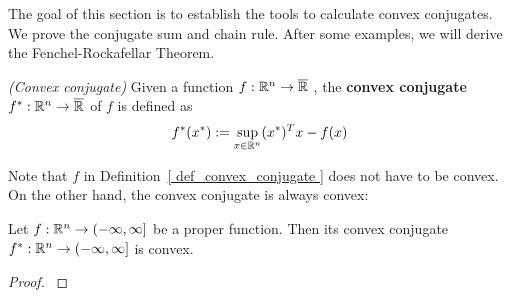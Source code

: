 The goal of this section is to establish the tools to calculate convex conjugates. 
We prove the conjugate sum and chain rule.
After some examples, we will derive the Fenchel-Rockafellar Theorem.
\begin{definition}
  \label{ def_convex_conjugate }
  \emph{(Convex conjugate)}
  Given a function
  $
    f:
    \mathbb{R}^n \to \overline{\mathbb{R}}
  $
  ,
  the 
  \textbf{convex conjugate}
  $
    f^*:
    \mathbb{R}^n \to \overline{\mathbb{R}}
  $
  of $f$ is defined as
  \begin{gather}
    f^*(x^*)
    :=
    \sup_{ x \in \mathbb{R}^n }
    (x^*)^T x - f(x)
  \end{gather}
\end{definition}

Note that $f$ in Definition~\ref{ def_convex_conjugate }
does not have to be convex. On the other hand, the convex conjugate is always convex:

\begin{proposition}
  Let  
  $
    f:
    \mathbb{R}^n \to ( - \infty, \infty ]
  $
  be a proper function. 
  Then its convex conjugate
  $
    f^*:
    \mathbb{R}^n \to ( - \infty, \infty ]
  $
  is convex.
\end{proposition}
\begin{proof}
  \cite[Proposition~4.2]{Mordukhovich2022}
\end{proof}


